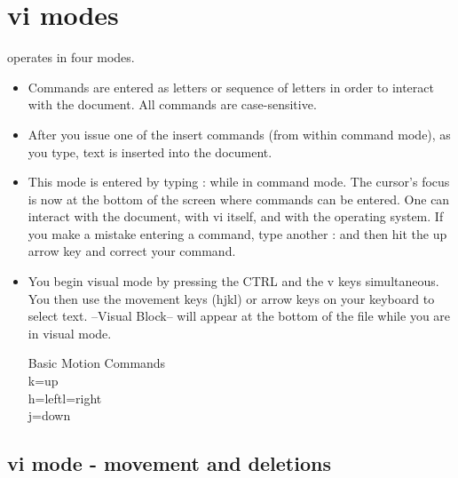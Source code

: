 \section{vi modes}
 operates in four modes.
\begin{itemize}
	\item {} Commands are entered as letters or sequence of letters in order to interact with the document. All commands are case-sensitive.
	\item {} After you issue one of the insert commands (from within command mode), as you type, text is inserted into the document.
	\item {} This mode is entered by typing : while in command mode. The cursor's focus is now at the bottom of the screen where commands can be entered. One can interact with the document, with vi itself, and with the operating system.  If you make a mistake entering a command, type another : and then hit the up arrow key and correct your command.
	\item {} You begin visual mode by pressing the CTRL and the v keys simultaneous. You then use the movement keys (hjkl) or arrow keys on your keyboard to select text. --Visual Block-- will appear at the bottom of the file while you are in visual mode.
\begin{center}
	Basic Motion Commands\\
	k=up\\
	h=left\qquad l=right\\
	j=down
\end{center}			
\end{itemize}

\subsection{vi mode - movement and deletions}

